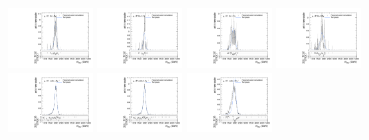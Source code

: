 \begin{figure}[htpb]
  \centering
  \includegraphics[width=0.2\textwidth]{fig/analysisAppendix/templateVsReco_VBFGbuToWW2000_r0_MVV_mu_HP_bb_LDy_linear.pdf}
  \includegraphics[width=0.2\textwidth]{fig/analysisAppendix/templateVsReco_VBFGbuToWW2000_r0_MVV_mu_LP_bb_LDy_linear.pdf}
  \includegraphics[width=0.2\textwidth]{fig/analysisAppendix/templateVsReco_VBFGbuToWW2000_r0_MVV_mu_HP_bb_HDy_linear.pdf}
  \includegraphics[width=0.2\textwidth]{fig/analysisAppendix/templateVsReco_VBFGbuToWW2000_r0_MVV_mu_LP_bb_HDy_linear.pdf}\\
  \includegraphics[width=0.2\textwidth]{fig/analysisAppendix/templateVsReco_VBFGbuToWW2000_r0_MVV_mu_HP_nobb_LDy_linear.pdf}
  \includegraphics[width=0.2\textwidth]{fig/analysisAppendix/templateVsReco_VBFGbuToWW2000_r0_MVV_mu_LP_nobb_LDy_linear.pdf}
  \includegraphics[width=0.2\textwidth]{fig/analysisAppendix/templateVsReco_VBFGbuToWW2000_r0_MVV_mu_HP_nobb_HDy_linear.pdf}

\end{figure}
